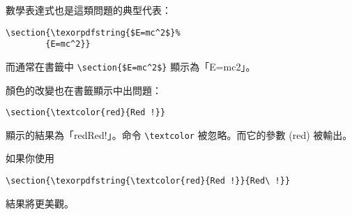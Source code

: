 數學表達式也是這類問題的典型代表：
\begin{code}
\begin{verbatim}
\section{\texorpdfstring{$E=mc^2$}%
        {E=mc^2}}
\end{verbatim}
\end{code}
而通常在書籤中 \verb+\section{$E=mc^2$}+ 顯示為「E=mc2」。


顏色的改變也在書籤顯示中出問題：
\begin{code}
\verb+\section{\textcolor{red}{Red !}}+
\end{code}
顯示的結果為「redRed!」。命令 \verb+\textcolor+ 被忽略。而它的參數 (red) 被輸出。


如果你使用
\begin{code}
\verb+\section{\texorpdfstring{\textcolor{red}{Red !}}{Red\ !}}+
\end{code}
結果將更美觀。


